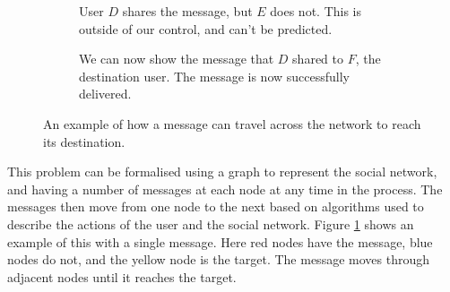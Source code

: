 \documentclass[bsc,frontabs,twoside,singlespacing,parskip,deptreport]{infthesis}     %
\begin{document}
\begin{figure}
\begin{subfigure}[]{0.48\textwidth}
\caption{User $D$ shares the message, but $E$ does not. This is outside of our control, and can't be predicted.}
\end{subfigure}
\quad
%
\begin{subfigure}[]{0.48\textwidth}
\centering
{}
\caption{We can now show the message that $D$ shared to $F$, the destination user. The message is now successfully delivered.}
\end{subfigure}
\caption{An example of how a message can travel across the network to reach its destination.}
\label{fig:intro_example}
\end{figure}

This problem can be formalised using a graph to represent the social network, and having a number of messages at each node at any time in the process. The messages then move from one node to the next based on algorithms used to describe the actions of the user and the social network. Figure \ref{fig:intro_example} shows an example of this with a single message. Here red nodes have the message, blue nodes do not, and the yellow node is the target. The message moves through adjacent nodes until it reaches the target.
\end{document}
